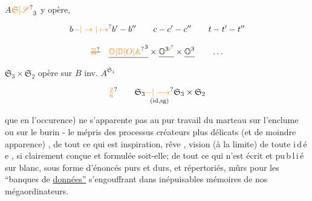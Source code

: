 $A$\qquad $\unsure{\mathfrak S|\mathscr S}_3$ y opère, 

\[
 b\unsure{-|\to|\mapsto}b'-b''\qquad c-c'-c''\qquad t-t'-t''
\]

\[
 \deleted{\unsure{\mathbb Z}}\quad
 \underline{\unsure{\mathbb O|\mathbb D|O|\mathbb A}^{3}}\times\underline{\mathbb O^{3\unsure{\prime}}}\times\underline{\mathbb O^{3}}\qquad\ldots
\]



$\mathfrak S_3\times\mathfrak S_2$ opère sur $B$ \quad inv. \quad $A^{\mathfrak S_3}$

\[
 \unsure{\tfrac26}\qquad \mathfrak S_3\underset{(\mathrm{id},\mathrm{sg})}{\unsure{-|\longrightarrow}}\mathfrak S_3\times\mathfrak S_2
\]

que en l'occurence) ne s'apparente pas au pur travail du marteau sur l'enclume ou sur le burin - le mépris des processus créateurs  plus délicats (et  de moindre apparence) ,  de tout ce qui est  inspiration, rêve , vision    (à la limite) de toute \mbox{i\,d\,é\,e} , si clairement conçue et formulée soit-elle; de tout ce qui n'est écrit et \mbox{pu\,b\,l\,i\,é}  sur blanc, sous forme d'énoncés purs et durs,   et répertoriés, mûrs pour les ``banques de \uline{données''} s'engouffrant dans  inépuisables mémoires de nos mégaordinateurs.

